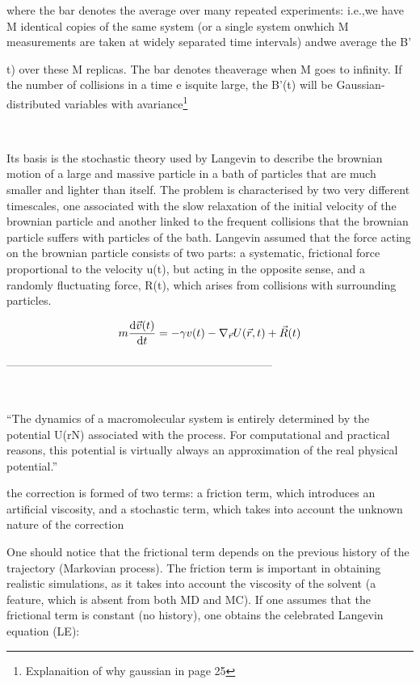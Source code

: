 \documentclass[../../main-notes.tex]{subfiles}
\begin{document}
where the bar denotes the average over many repeated experiments: i.e.,we have M identical copies of the same system (or a single system onwhich M measurements are taken at widely separated time intervals) andwe average the B'{t) over these M replicas. The bar denotes theaverage when M goes to infinity. If the number of collisions in a time e isquite large, the B'(t) will be Gaussian-distributed variables with avariance\footnote{Explanaition of why gaussian in page 25}

~\citep{Parisi_1988}

Its basis is the stochastic theory used by Langevin to describe the brownian motion of a large and massive particle in a bath of particles that are much smaller and lighter than itself. 
The problem is characterised by two very different timescales, one associated with the slow relaxation of the initial velocity of the brownian particle and another linked to the frequent collisions that the brownian particle suffers with particles of the bath. 
Langevin assumed that the force acting on the brownian particle consists of two parts: a systematic, frictional force proportional to the velocity u(t), but acting in the opposite sense, and a randomly fluctuating force, R(t), which arises from collisions with surrounding particles.


\begin{gather}
    m\dv{\vec{v}(t)}{t} = -\gamma v(t) -\nabla_{\vec{r}} U(\vec{r},t) + \vec{R}(t)
\end{gather}



-----------------------------------------------------------------------

~\citep{paquetMolecularDynamicsMonte2015}

“The dynamics of a macromolecular system is entirely determined by the potential U(rN) associated with the process. For computational and practical reasons, this potential is virtually always an approximation of the real physical potential.” 

the correction is formed of two terms: a friction term, which introduces an artificial viscosity, and a stochastic term, which takes into account the unknown nature of the correction

One should notice that the frictional term depends on the previous history of the trajectory (Markovian process). The friction term is important in obtaining realistic simulations, as it takes into account the viscosity of the solvent (a feature, which is absent from both MD and MC). If one assumes that the frictional term is constant (no history), one obtains the celebrated Langevin equation (LE):

}
\end{document}
